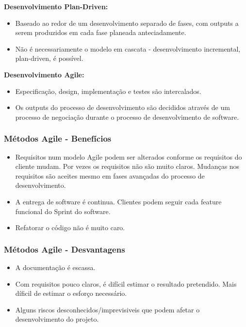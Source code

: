 \documentclass{article}
\begin{document}
\begin{flushleft}
  \textbf{Desenvolvimento Plan-Driven:}
  \begin{itemize}
    \item Baseado ao redor de um desenvolvimento separado de fases,
    com outputs a serem produzidos em cada fase planeada anteciadamente.
    \item Não é necessariamente o modelo em cascata - desenvolvimento
    incremental, plan-driven, é possível.
  \end{itemize}

  \vspace{2mm}

  \textbf{Desenvolvimento Agile:}
  \begin{itemize}
    \item Especificação, design, implementação e testes são intercalados.
    \item Os outputs do processo de desenvolvimento são decididos
    através de um processo de negociação durante o processo de desenvolvimento
    de software.
  \end{itemize}
\end{flushleft}

\pagebreak

\subsubsection{Métodos Agile - Benefícios}

\begin{itemize}
  \item Requisitos num modelo Agile podem ser alterados
  conforme os requisitos do cliente mudam. Por vezes os requisitos
  não são muito claros. Mudanças nos requisitos são aceites
  mesmo em fases avançadas do processo de desenvolvimento.

  \item A entrega de software é continua. Clientes podem seguir
  cada feature funcional do Sprint do software.

  \item Refatorar o código não é muito caro.
\end{itemize}

\subsubsection{Métodos Agile - Desvantagens}

\begin{itemize}
  \item A documentação é escassa.
  \item Com requisitos pouco claros, é difícil estimar o resultado pretendido.
  Mais díficil de estimar o esforço necessário.
  \item Alguns riscos desconhecidos/imprevisiveis que podem afetar o desenvolvimento do projeto. 
\end{itemize}
\end{document}
